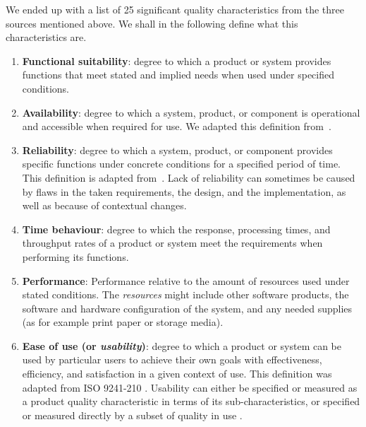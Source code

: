 We ended up with a list of 25 significant quality characteristics from the three sources mentioned above. We shall in the following define what this characteristics are.

\begin{enumerate}
    \item \textbf{Functional suitability}: degree to which a product or system provides functions that meet stated and implied needs when used under specified conditions.

    \item \textbf{Availability}: degree to which a system, product, or component is operational and accessible when required for use. We adapted this definition from~\cite{iso_central_secretary_isoiecieee_2010}.

    \item \textbf{Reliability}: degree to which a system, product, or component provides specific functions under concrete conditions for a specified period of time. This definition is adapted from~\cite{iso_central_secretary_isoiecieee_2010}. Lack of reliability can sometimes be caused by flaws in the taken requirements, the design, and the implementation, as well as because of contextual changes.  

    \item \textbf{Time behaviour}: degree to which the response, processing times, and throughput rates of a product or system meet the requirements when performing its functions.

    \item \textbf{Performance}: Performance relative to the amount of resources used under stated conditions. The \textit{resources} might include other software products, the software and hardware configuration of the system, and any needed supplies (as for example print paper or storage media).

    \item \textbf{Ease of use (or \textit{usability})}: degree to which a product or system can be used by particular users to achieve their own goals with effectiveness, efficiency, and satisfaction in a given context of use. This definition was adapted from ISO 9241-210 . Usability can either be specified or measured as a product quality characteristic in terms of its sub-characteristics, or specified or measured directly by a subset of quality in use .


\end{enumerate}
